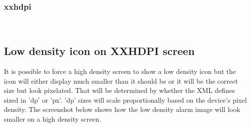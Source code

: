 \documentclass[11pt,english,numbers=endperiod,parskip=half]{scrartcl}
\begin{document}
{{\subsubsection{xxhdpi}
\\
\bigskip

\subsection{Low density icon on XXHDPI screen}
\raggedright
It is possible to force a high density screen to show a low density icon but the icon will either display much smaller than it should be or it will be the correct size but look pixelated. That will be determined by whether the XML defines sized in 'dp' or 'px'. 'dp' sizes will scale proportionally based on the device's pixel density. The screenshot below shows how the low density alarm image will look smaller on a high density screen. 

\\
\bigskip

}}
\end{document}

